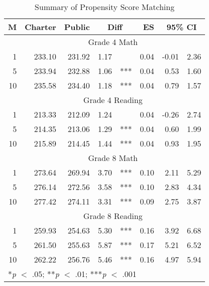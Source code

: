 \begin{table}[ht]
\begin{center}
\caption{Summary of Propensity Score Matching}
\begin{tabular}{rrrr@{}lrrr}
  \hline
  M & Charter & Public & \multicolumn{2}{c}{Diff} & ES & \multicolumn{2}{c}{95\% CI} \\ \hline  & \multicolumn{7}{c}{Grade 4 Math} \\ \cline{2-8}  1 & 233.10 & 231.92 & 1.17 &  & 0.04 & -0.01 & 2.36 \\ 
    5 & 233.94 & 232.88 & 1.06 & *** & 0.04 & 0.53 & 1.60 \\ 
   10 & 235.58 & 234.40 & 1.18 & *** & 0.04 & 0.79 & 1.57 \\ 
    & \multicolumn{7}{c}{Grade 4 Reading} \\ \cline{2-8}  1 & 213.33 & 212.09 & 1.24 &  & 0.04 & -0.26 & 2.74 \\ 
    5 & 214.35 & 213.06 & 1.29 & *** & 0.04 & 0.60 & 1.99 \\ 
   10 & 215.89 & 214.45 & 1.44 & *** & 0.04 & 0.93 & 1.95 \\ 
    & \multicolumn{7}{c}{Grade 8 Math} \\ \cline{2-8}  1 & 273.64 & 269.94 & 3.70 & *** & 0.10 & 2.11 & 5.29 \\ 
    5 & 276.14 & 272.56 & 3.58 & *** & 0.10 & 2.83 & 4.34 \\ 
   10 & 277.42 & 274.11 & 3.31 & *** & 0.09 & 2.75 & 3.87 \\ 
    & \multicolumn{7}{c}{Grade 8 Reading} \\ \cline{2-8}  1 & 259.93 & 254.63 & 5.30 & *** & 0.16 & 3.92 & 6.68 \\ 
    5 & 261.50 & 255.63 & 5.87 & *** & 0.17 & 5.21 & 6.52 \\ 
   10 & 262.22 & 256.76 & 5.46 & *** & 0.16 & 4.97 & 5.94 \\ 
   \hline \multicolumn{8}{l}{*\textit{p} $<$ .05; **\textit{p} $<$ .01; ***\textit{p} $<$ .001} \\ \end{tabular}
\end{center}
\end{table}
